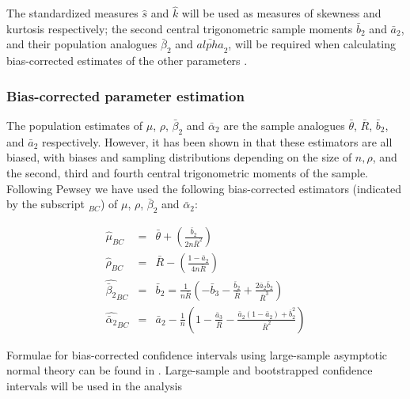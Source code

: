 \documentclass[../../ArchStats.tex]{subfiles}
\begin{document}
The standardized measures $\hat{s}$ and $\hat{k}$ will be used as measures of skewness and kurtosis respectively; the second central trigonometric sample moments $\bar{b}_2$ and $\bar{a}_2$, and their population analogues $\bar{\beta}_2$ and $\bar{alpha}_2$, will be required when calculating bias-corrected estimates of the other parameters .


\subsubsection{Bias-corrected parameter estimation}
\label{sec:bias-corrected}
The population estimates of $\mu$, $\rho$, $\bar{\beta}_2$ and $\bar{\alpha}_2$ are the sample analogues $\bar{\theta}$, $\bar{R}$, $\bar{b}_2$, and $\bar{a}_2$ respectively. However, it has been shown in \cite{Pewsey2004b} that these estimators are all biased, with biases and sampling distributions depending on the size of $n, \rho$, and the second, third and fourth central trigonometric moments of the sample. Following Pewsey \cite{Pewsey2014} we have used the following bias-corrected estimators (indicated by the subscript $_{BC}$) of $\mu$, $\rho$, $\bar{\beta}_2$ and $\bar{\alpha}_2$:

\begin{eqnarray*}
\hat{\mu}_{BC} &=& \bar{\theta} + \left(\frac{\bar{b}_2}{2n\bar{R}^2} \right)\\[5pt]
\hat{\rho}_{BC} &=& \bar{R} - \left(\frac{1-\bar{a}_2}{4n\bar{R}}\right)\\[5pt]
\widehat{\bar{\beta}_2}_{BC} &=& \bar{b}_2 = \frac{1}{n\bar{R}} \left(-\bar{b}_3 - \frac{\bar{b}_2}{\bar{R}} + \frac{2\bar{a}_2\bar{b}_2}{\bar{R}^3}\right)\\[5pt]
\widehat{\bar{\alpha}_2}_{BC} &=& \bar{a}_2 - \frac{1}{n} \left(1-\frac{\bar{a}_3}{\bar{R}}-\frac{\bar{a}_2(1-\bar{a}_2) + \bar{b}_2^2}{\bar{R}^2}\right)
\end{eqnarray*}

Formulae for bias-corrected confidence intervals using large-sample asymptotic normal theory can be found in \cite{Pewsey2014}. Large-sample and bootstrapped confidence intervals will be used in the analysis 
\end{document}
